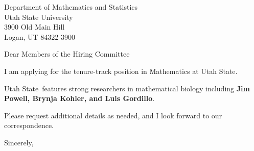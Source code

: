 




	
	
	\def\School{Utah State}
	
	\begin{letter}
		{Department of Mathematics and Statistics\\
			Utah State University\\
			3900 Old Main Hill\\
			Logan, UT 84322-3900
		}
		
		\opening{Dear Members of the Hiring Committee}
		
		
		I am applying for the tenure-track position in Mathematics at \School. 
		
		\School~features strong researchers in mathematical biology including \textbf{Jim Powell, Brynja Kohler, and Luis Gordillo}. 
		
		
		
		
		
		Please request additional details as needed, and I look forward to our correspondence.
		
		\closing{Sincerely,}
	\end{letter}
